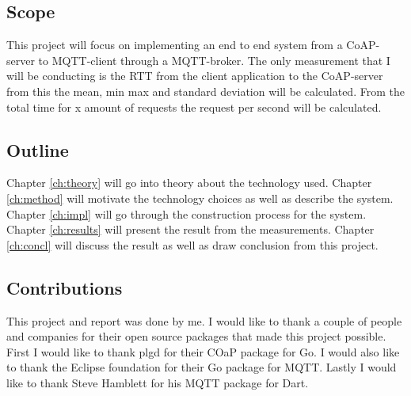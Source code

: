 
\subsection{Scope}
\label{ch:intro:scope}
This project will focus on implementing an end to end system from a CoAP-server to MQTT-client through a MQTT-broker. The only measurement that I will be conducting is the RTT from the client application to the CoAP-server from this the mean, min max and standard deviation will be calculated. From the total time for x amount of requests the request per second will be calculated.

\subsection{Outline}
\label{ch:intro:outline}
Chapter \ref{ch:theory} will go into theory about the technology used. Chapter \ref{ch:method} will motivate the technology choices as well as describe the system. Chapter \ref{ch:impl} will go through the construction process for the system. Chapter \ref{ch:results} will present the result from the measurements. Chapter \ref{ch:concl} will discuss the result as well as draw conclusion from this project.

\subsection{Contributions}
\label{ch:intro:contributions}
This project and report was done by me.
I would like to thank a couple of people and companies for their open source packages that made this project possible.
First I would like to thank plgd for their COaP package for Go.
I would also like to thank the Eclipse foundation for their Go package for MQTT.
Lastly I would like to thank Steve Hamblett for his MQTT package for Dart.
